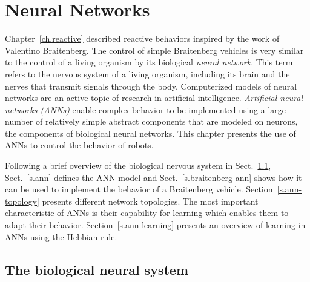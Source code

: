 
\chapter{Neural Networks}\label{ch.neural}


Chapter~\ref{ch.reactive} described reactive behaviors inspired by the work of Valentino Braitenberg. The control of simple Braitenberg vehicles is very similar to the control of a living organism by its biological \emph{neural network}. This term refers to the nervous system of a living organism, including its brain and the nerves that transmit signals through the body. Computerized models of neural networks are an active topic of research in artificial intelligence. \emph{Artificial neural networks (ANNs)} enable complex behavior to be implemented using a large number of relatively simple abstract components that are modeled on neurons, the components of biological neural networks. This chapter presents the use of ANNs to control the behavior of robots.

Following a brief overview of the biological nervous system in Sect.~\ref{s.bio-nn}, Sect.~\ref{s.ann} defines the ANN model and Sect.~\ref{s.braitenberg-ann} shows how it can be used to implement the behavior of a Braitenberg vehicle. Section~\ref{s.ann-topology} presents different network topologies. The most important characteristic of ANNs is their capability for learning which enables them to adapt their behavior. Section~\ref{s.ann-learning} presents an overview of learning in ANNs using the Hebbian rule.

\section{The biological neural system}\label{s.bio-nn}


